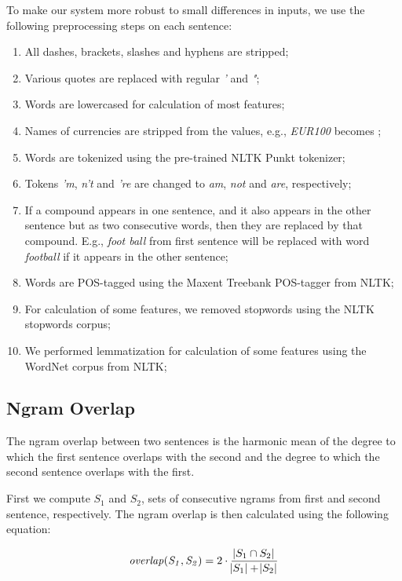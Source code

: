 \documentclass[10pt, a4paper]{article}
\begin{document}
To make our system more robust to small differences in inputs, we use the following preprocessing steps on each sentence:
\begin{enumerate} \itemsep1pt \parskip0pt 
  \item All dashes, brackets, slashes and hyphens are stripped;
  \item Various quotes are replaced with regular \textit{'} and \textit{"};
  \item Words are lowercased for calculation of most features;
  \item Names of currencies are stripped from the values, e.g., \textit{\EUR EUR100} becomes \textit{};
  \item Words are tokenized using the pre-trained NLTK Punkt tokenizer;
  \item Tokens \textit{'m}, \textit{n't} and \textit{'re} are changed to \textit{am}, \textit{not} and \textit{are}, respectively;
  \item If a compound appears in one sentence, and it also appears in the other sentence but as two consecutive words, then they are replaced by that compound. E.g., \textit{foot ball} from first sentence will be replaced with word \textit{football} if it appears in the other sentence;
  \item Words are POS-tagged using the Maxent Treebank POS-tagger from NLTK;
  \item For calculation of some features, we removed stopwords using the NLTK stopwords corpus;
  \item We performed lemmatization for calculation of some features using the WordNet corpus from NLTK;
\end{enumerate}

\subsection{Ngram Overlap} 

The ngram overlap between two sentences is the harmonic mean of the degree to which the first sentence overlaps with the second and the degree to which the second sentence overlaps with the first.

First we compute $S_1$ and $S_2$, sets of consecutive ngrams from first and second sentence, respectively. The ngram overlap is then calculated using the following equation:

\begin{equation}
\mathit{overlap(S_1, S_2)} = 2 \cdot \frac{\abs{S_1 \cap S_2}}{\abs{S_1} + \abs{S_2}}
\end{equation}
\end{document}
